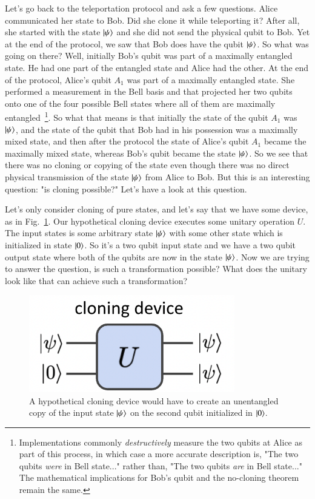 Let's go back to the teleportation protocol and ask a few questions. Alice communicated her state to Bob. Did she clone it while teleporting it? After all, she started with the state $\left| \psi \right\rangle$ and she did not send the physical qubit to Bob. Yet at the end of the protocol, we saw that Bob does have the qubit $\left| \psi \right\rangle$. So what was going on there? Well, initially Bob's qubit was part of a maximally entangled state. He had one part of the entangled state and Alice had the other. At the end of the protocol, Alice's qubit $A_1$ was part of a maximally entangled state. She performed a measurement in the Bell basis and that projected her two qubits onto one of the four possible Bell states where all of them are maximally entangled~\footnote{Implementations commonly \emph{destructively} measure the two qubits at Alice as part of this process, in which case a more accurate description is, "The two qubits \emph{were} in Bell state..." rather than, "The two qubits \emph{are} in Bell state..." The mathematical implications for Bob's qubit and the no-cloning theorem remain the same.}. So what that means is that initially the state of the qubit $A_1$ was $\left| \psi \right\rangle$, and the state of the qubit that Bob had in his possession was a maximally mixed state, and then after the protocol the state of Alice's qubit $A_1$ became the maximally mixed state, whereas Bob's qubit became the state $\left| \psi \right\rangle$. So we see that there was no cloning or copying of the state even though there was no direct physical transmission of the state $\left| \psi \right\rangle$ from Alice to Bob. But this is an interesting question: "is cloning possible?"  Let's have a look at this question.

Let's only consider cloning of pure states, and let's say that we have some device, as in Fig.~\ref{fig:cloner}. Our hypothetical cloning device executes some unitary operation $U$. The input states is some arbitrary state $\left| \psi \right\rangle$ with some other state which is initialized in state $\left| 0 \right\rangle$. So it's a two qubit input state and we have a two qubit output state where both of the qubits are now in the state $\left| \psi \right\rangle$. Now we are trying to answer the question, is such a transformation possible? What does the unitary look like that can achieve such a transformation?
\begin{figure}[H]
    \centering
    \includegraphics[width=0.8\textwidth]{lesson8/cloning-device.png}
        \caption{A hypothetical cloning device would have to create an unentangled copy of the input state $\left| \psi \right\rangle$ on the second qubit initialized in $\left| 0 \right\rangle$.}
    \label{fig:cloner}
\end{figure}

